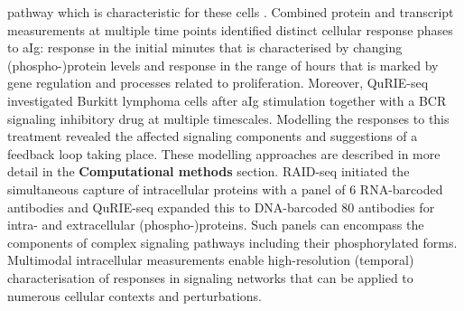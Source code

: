 \documentclass[times, twoside, watermark]{zHenriquesLab-StyleBioRxiv}
\begin{document}
pathway which is characteristic for these cells \cite{Rivello2020}. Combined protein and transcript measurements at multiple time points identified distinct cellular response phases to aIg: response in the initial minutes that is characterised by changing (phospho-)protein levels and response in the range of hours that is marked by gene regulation and processes related to proliferation. Moreover, QuRIE-seq investigated Burkitt lymphoma cells after aIg stimulation together with a BCR signaling inhibitory drug at multiple timescales. Modelling the responses to this treatment revealed the affected signaling components and suggestions of a feedback loop taking place. These modelling approaches are described in more detail in the \textbf{Computational methods} section. \newline RAID-seq initiated the simultaneous capture of intracellular proteins with a panel of 6 RNA-barcoded antibodies and QuRIE-seq expanded this to DNA-barcoded 80 antibodies for intra- and extracellular (phospho-)proteins. Such panels can encompass the components of complex signaling pathways including their phosphorylated forms. Multimodal intracellular measurements enable high-resolution (temporal) characterisation of responses in signaling networks that can be applied to numerous cellular contexts and perturbations. 
\end{document}
